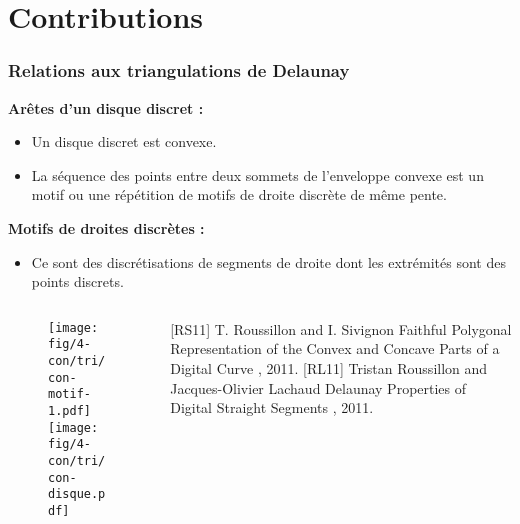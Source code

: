 \section{Contributions}

\begin{frame}
\frametitle{Relations aux triangulations de Delaunay}


{
  \begin{block}{}
    \textbf{Arêtes d'un disque discret :}\\
	  \begin{itemize}
      \item Un disque discret est convexe.
      \item La séquence des points entre deux sommets de l'enveloppe convexe est un motif ou une répétition de motifs de droite discrète de même pente.
    \end{itemize}
    
	  \textbf{Motifs de droites discrètes :}\\
	  \begin{itemize}
      \item Ce sont des discrétisations de segments de droite dont les extrémités sont des points discrets.
    \end{itemize}
  \end{block}

  \begin{columns}[t]
    \begin{column}{0.5\linewidth}
    	\begin{figure}[H]
	      \centering
	      \texttt{[image: fig/4-con/tri/con-motif-1.pdf]}
	      \texttt{[image: fig/4-con/tri/con-disque.pdf]}	      
	    \end{figure}

    \end{column}
    \begin{column}{0.5\linewidth}
      \begin{thebibliography}{alpha}
      \scriptsize
        [RS11] T. Roussillon and I. Sivignon
        \newblock Faithful Polygonal Representation of the Convex and Concave Parts of a Digital Curve
        , 2011.    
        [RL11] Tristan Roussillon and Jacques-Olivier Lachaud
        \newblock Delaunay Properties of Digital Straight Segments
        , 2011.
      \end{thebibliography}
      \scriptsize     
    \end{column}
  \end{columns}   
}


\end{frame}
